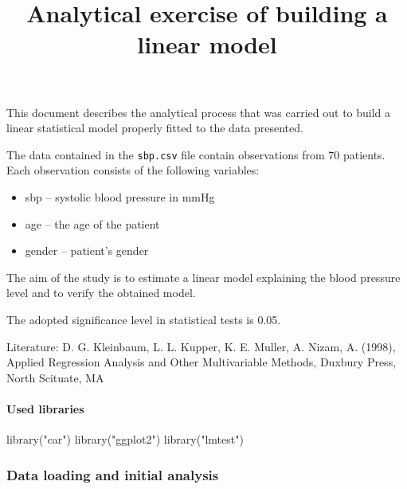 \documentclass[
]{article}
\title{Analytical exercise of building a linear model}
\author{}
\date{\vspace{-2.5em}}
\newenvironment{Shaded}{\begin{snugshade}}{\end{snugshade}}
\newcommand{\FunctionTok}[1]{\textcolor[rgb]{0.00,0.00,0.00}{#1}}
\newcommand{\NormalTok}[1]{#1}
\newcommand{\StringTok}[1]{\textcolor[rgb]{0.31,0.60,0.02}{#1}}
\providecommand{\tightlist}{%
  \setlength{\itemsep}{0pt}\setlength{\parskip}{0pt}}
\begin{document}
\maketitle

{
\setcounter{tocdepth}{2}
\tableofcontents
}
This document describes the analytical process that was carried out to
build a linear statistical model properly fitted to the data presented.

The data contained in the \texttt{sbp.csv} file contain observations
from 70 patients. Each observation consists of the following variables:

\begin{itemize}
\tightlist
\item
  sbp -- systolic blood pressure in mmHg
\item
  age -- the age of the patient
\item
  gender -- patient's gender
\end{itemize}

The aim of the study is to estimate a linear model explaining the blood
pressure level and to verify the obtained model.

The adopted significance level in statistical tests is 0.05.

Literature: D. G. Kleinbaum, L. L. Kupper, K. E. Muller, A. Nizam, A.
(1998), Applied Regression Analysis and Other Multivariable Methods,
Duxbury Press, North Scituate, MA

\hypertarget{used-libraries}{%
\paragraph{Used libraries}\label{used-libraries}}

\begin{Shaded}
\begin{Highlighting}[]
\FunctionTok{library}\NormalTok{(}\StringTok{"car"}\NormalTok{)}
\FunctionTok{library}\NormalTok{(}\StringTok{"ggplot2"}\NormalTok{)}
\FunctionTok{library}\NormalTok{(}\StringTok{"lmtest"}\NormalTok{)}
\end{Highlighting}
\end{Shaded}

\hypertarget{data-loading-and-initial-analysis}{%
\subsubsection{Data loading and initial
analysis}\label{data-loading-and-initial-analysis}}
\end{document}

